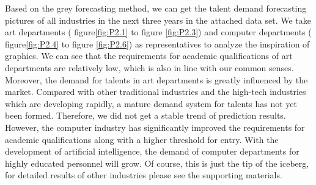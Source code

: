 \documentclass{mcmthesis}
\begin{document}
\par\noindent
Based on the grey forecasting method, we can get the talent demand forecasting pictures of all industries in the next three years in the attached data set. We take art departments ( figure\ref{fig:P2.1} to figure \ref{fig:P2.3}) and computer departments ( figure\ref{fig:P2.4} to figure \ref{fig:P2.6}) as representatives to analyze the inspiration of graphics. We can see that the requirements for academic qualifications of art departments are relatively low, which is also in line with our common senses. Moreover, the demand for talents in art departments is greatly influenced by the market. Compared with other traditional industries and the high-tech industries which are developing rapidly, a mature demand system for talents has not yet been formed. Therefore, we did not get a stable trend of prediction results. However, the computer industry has significantly improved the requirements for academic qualifications along with a higher threshold for entry. With the development of artificial intelligence, the demand of computer departments for highly educated personnel will grow. Of course, this is just the tip of the iceberg, for detailed results of other industries please see the supporting materials.
\end{document}
